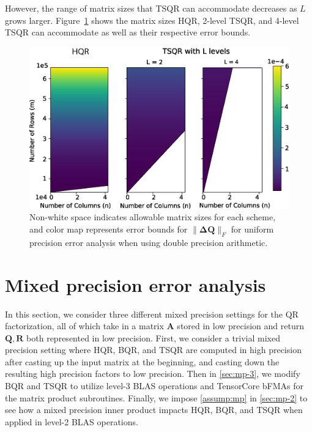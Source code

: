 \documentclass[review,onefignum,onetabnum]{siamart190516}
\newcommand{\bb}[1]{\mathbf{#1}}
\begin{document}
However, the range of matrix sizes that TSQR can accommodate decreases as $L$ grows larger.
Figure~\ref{fig:paramspace} shows the matrix sizes HQR, 2-level TSQR, and 4-level TSQR can accommodate as well as their respective error bounds.\par
\begin{figure}
	\centering
	\includegraphics[width=.45\textwidth]{./figures/paramspace.png}
	\caption{\label{fig:paramspace} Non-white space indicates allowable matrix sizes for each scheme, and color map represents error bounds for $\|\bb{\Delta Q}\|_F$ for uniform precision error analysis when using double precision arithmetic.}
	\vspace{-10pt}	
\end{figure}


\section{Mixed precision error analysis}\label{sec:mpanalysis}
%
In this section, we consider three different mixed precision settings for the QR factorization, all of which take in a matrix $\bb{A}$ stored in low precision and return $\bb{Q},\bb{R}$ both represented in low precision. 
First, we consider a trivial mixed precision setting where HQR, BQR, and TSQR are computed in high precision after casting up the input matrix at the beginning, and casting down the resulting high precision factors to low precision. 
Then in \cref{sec:mp-3}, we modify BQR and TSQR to utilize level-3 BLAS operations and TensorCore bFMAs for the matrix product subroutines. 
Finally, we impose \cref{assump:mp} in \cref{sec:mp-2} to see how a mixed precision inner product impacts HQR, BQR, and TSQR when applied in level-2 BLAS operations.
\end{document}
